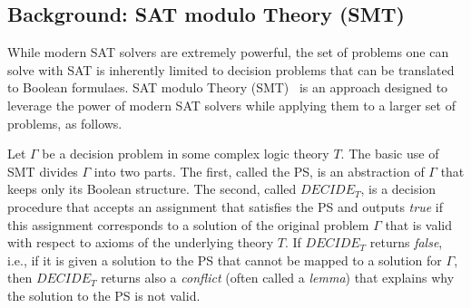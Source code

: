 \documentclass[review]{elsarticle}
\newcommand{\decidet}{\ensuremath{\mathit{DECIDE_T}}\xspace}
\newcommand\pavel[1]{\nb{\textbf{Pavel:}}{blue}{#1}}
\newcommand{\ps}{\ac{PS}\xspace}
\newcommand{\true}{\textit{true}\xspace}
\newcommand{\false}{\textit{false}\xspace}
\begin{document}



\subsection{Background: SAT modulo Theory (SMT)}
\label{sec:background-smt}

While modern SAT solvers are extremely powerful, the set of problems one can solve with SAT is inherently limited to decision problems that can be translated to Boolean formulaes. 
SAT modulo Theory (SMT)~\cite{DBLP:journals/jacm/NieuwenhuisOT06,DBLP:journals/constraints/BofillPSV12,DBLP:conf/cp/Nieuwenhuis10} is an approach designed to leverage the power of modern SAT solvers while applying them to a larger set of problems, as follows. 


Let $\Gamma$ be a decision problem in some complex logic theory $T$. 
The basic use of SMT divides $\Gamma$ into two parts. The first, called the \ps, is an abstraction of $\Gamma$ that keeps only its Boolean structure. The second, called \decidet, is a decision procedure that accepts an assignment that satisfies the \ps and outputs \true if this assignment 
corresponds to a solution of the original problem $\Gamma$ that is valid with respect to axioms of the underlying theory $T$. 
If \decidet returns \false, i.e., if it is given a solution to the \ps that cannot be mapped to a solution for $\Gamma$, then \decidet returns also a \emph{conflict}  (often called a {\em lemma}) that explains why the solution to the \ps is not valid. 
\end{document}
